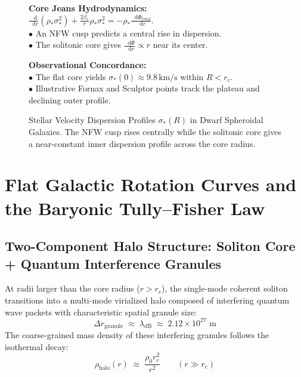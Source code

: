\documentclass[
    12pt,
    a4paper,
    headings=normal,
    twoside=false,
    open=any,
    parskip=half
]{scrbook}
\newcommand{\diff}{\mathop{}\!\mathrm{d}}
\begin{document}
\begin{figure}[htbp]
\begin{tcolorbox}[colback=white, colframe=secondarycolor!70, arc=2mm, boxrule=0.7pt, left=6pt, right=6pt, top=4pt, bottom=4pt, width=\linewidth]
\scriptsize\sffamily
\begin{minipage}[t]{0.48\textwidth}
  \textbf{\color{maincolor}Core Jeans Hydrodynamics:}\\[1pt]
  $\frac{\diff}{\diff r}(\rho_*\sigma_*^2)+\frac{2\beta_*}{r}\rho_*\sigma_*^2=-\rho_*\frac{\diff\Phi_{\text{total}}}{\diff r}$.\\[2pt]
  $\bullet$ An NFW cusp predicts a central rise in dispersion.\\[1pt]
  $\bullet$ The solitonic core gives $\frac{\diff\Phi}{\diff r}\propto r$ near its center.
\end{minipage}\hfill
\begin{minipage}[t]{0.48\textwidth}
  \textbf{\color{accentcolor}Observational Concordance:}\\[1pt]
  $\bullet$ The flat core yields $\sigma_*(0)\approx9.8\,\text{km/s}$ within $R<r_c$.\\[1pt]
  $\bullet$ Illustrative Fornax and Sculptor points track the plateau and declining outer profile.
\end{minipage}
\end{tcolorbox}
\vspace{-2mm}
\caption{Stellar Velocity Dispersion Profiles $\sigma_*(R)$ in Dwarf Spheroidal Galaxies. The NFW cusp rises centrally while the solitonic core gives a near-constant inner dispersion profile across the core radius.}
\label{fig:ch11_dwarf_dispersion_profile}
\end{figure}

\section{Flat Galactic Rotation Curves and the Baryonic Tully--Fisher Law}
\label{sec:ch11_galactic_rotation_curves_tully_fisher}

\subsection{Two-Component Halo Structure: Soliton Core + Quantum Interference Granules}

At radii larger than the core radius ($r > r_c$), the single-mode coherent soliton transitions into a multi-mode virialized halo composed of interfering quantum wave packets with characteristic spatial granule size:
\begin{equation}
\Delta r_{\text{granule}} \;\approx\; \lambda_{\text{dB}} \;\approx\; 2.12 \times 10^{27} \text{ m}
\end{equation}
The coarse-grained mass density of these interfering granules follows the isothermal decay:
\begin{equation}
\rho_{\text{halo}}(r) \;\approx\; \frac{\rho_0 r_c^2}{r^2} \qquad (r \gg r_c)
\label{eq:ch11_isothermal_halo_tail}
\end{equation}
\end{document}
